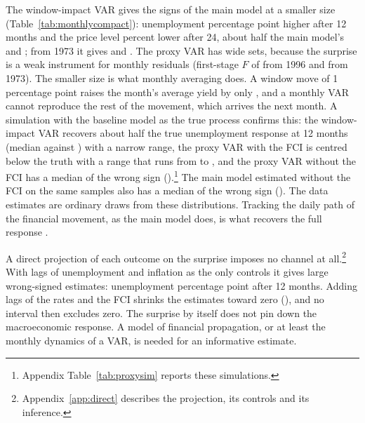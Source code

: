 \documentclass[11pt]{article}
\begin{document}
The window-impact VAR gives the signs of the main model at a smaller size (Table~\ref{tab:monthlycompact}): unemployment  percentage point higher after 12 months and the price level  percent lower after 24, about half the main model's  and ; from 1973 it gives  and . The proxy VAR has wide sets, because the surprise is a weak instrument for monthly residuals (first-stage $F$ of  from 1996 and  from 1973). The smaller size is what monthly averaging does. A window move of 1 percentage point raises the month's average yield by only , and a monthly VAR cannot reproduce the rest of the movement, which arrives the next month. A simulation with the baseline model as the true process confirms this: the window-impact VAR recovers about half the true unemployment response at 12 months (median  against ) with a narrow range, the proxy VAR with the FCI is centred below the truth with a range that runs from  to , and the proxy VAR without the FCI has a median of the wrong sign ().\footnote{Appendix Table~\ref{tab:proxysim} reports these simulations.} The main model estimated without the FCI on the same samples also has a median of the wrong sign (). The data estimates are ordinary draws from these distributions. Tracking the daily path of the financial movement, as the main model does, is what recovers the full response \citep{jacobson2026}.

A direct projection of each outcome on the surprise imposes no channel at all.\footnote{Appendix~\ref{app:direct} describes the projection, its controls and its inference.} With lags of unemployment and inflation as the only controls it gives large wrong-signed estimates: unemployment  percentage point after 12 months. Adding lags of the rates and the FCI shrinks the estimates toward zero (), and no interval then excludes zero. The surprise by itself does not pin down the macroeconomic response. A model of financial propagation, or at least the monthly dynamics of a VAR, is needed for an informative estimate.
\end{document}
